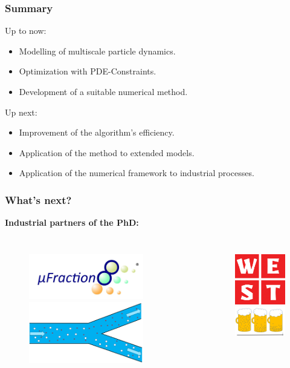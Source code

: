 \documentclass[aspectratio=169,xcolor=dvipsnames]{beamer}
\begin{document}
\begin{frame}
	\frametitle{Summary}
Up to now:
 \begin{itemize}
 	\item Modelling of multiscale particle dynamics.
 	\item Optimization with PDE-Constraints.
 	\item Development of a suitable numerical method.
 \end{itemize}
Up next:
\begin{itemize}
	\item Improvement of the algorithm's efficiency.
	\item Application of the method to extended models.
 	\item Application of the numerical framework to industrial processes.
 \end{itemize}
	
\end{frame}
\begin{frame}
	\frametitle{What's next?}
	\textbf{Industrial partners of the PhD:}
	\begin{columns}
		\begin{figure}
			\includegraphics[width=5cm]{ufraction8.png}
			\includegraphics[width=5cm]{Microfilter.png}
		\end{figure}
		
		\begin{figure}
			\includegraphics[width=3cm]{west.png}\\
			\includegraphics[width=3.5cm]{beer.png}
		\end{figure}
	\end{columns}
\end{frame}
\end{document}

